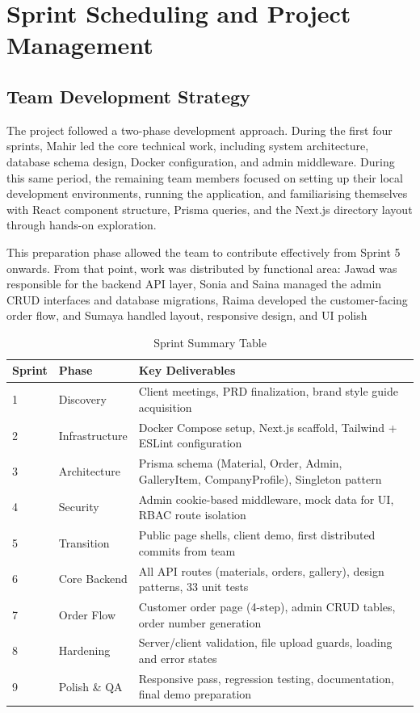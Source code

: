 \documentclass[12pt, a4paper]{article}
\begin{document}
\section{Sprint Scheduling and Project Management}

\subsection{Team Development Strategy}

The project followed a two-phase development approach. During the first four sprints, Mahir led the core technical work, including system architecture, database schema design, Docker configuration, and admin middleware. During this same period, the remaining team members focused on setting up their local development environments, running the application, and familiarising themselves with React component structure, Prisma queries, and the Next.js directory layout through hands-on exploration.

This preparation phase allowed the team to contribute effectively from Sprint 5 onwards. From that point, work was distributed by functional area: Jawad was responsible for the backend API layer, Sonia and Saina managed the admin CRUD interfaces and database migrations, Raima developed the customer-facing order flow, and Sumaya handled layout, responsive design, and UI polish

\begin{table}[H]
\centering
\caption{Sprint Summary Table}
\begin{tabularx}{\textwidth}{p{1.5cm}p{3.5cm}X}
\toprule
\textbf{Sprint} & \textbf{Phase} & \textbf{Key Deliverables} \\
\midrule
1 & Discovery & Client meetings, PRD finalization, brand style guide acquisition \\
2 & Infrastructure & Docker Compose setup, Next.js scaffold, Tailwind + ESLint configuration \\
3 & Architecture & Prisma schema (Material, Order, Admin, GalleryItem, CompanyProfile), Singleton pattern \\
4 & Security & Admin cookie-based middleware, mock data for UI, RBAC route isolation \\
5 & Transition & Public page shells, client demo, first distributed commits from team \\
6 & Core Backend & All API routes (materials, orders, gallery), design patterns, 33 unit tests \\
7 & Order Flow & Customer order page (4-step), admin CRUD tables, order number generation \\
8 & Hardening & Server/client validation, file upload guards, loading and error states \\
9 & Polish \& QA & Responsive pass, regression testing, documentation, final demo preparation \\
\bottomrule
\end{tabularx}
\end{table}
\end{document}
